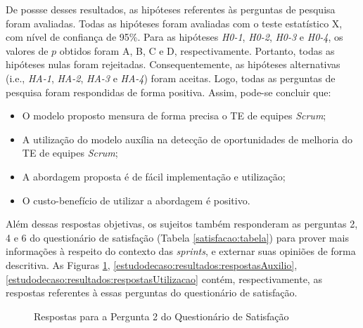 De possse desses resultados, as hipóteses referentes às perguntas de pesquisa foram avaliadas. Todas as hipóteses foram avaliadas com o teste estatístico X, com nível de confiança de 95\%. Para as hipóteses \textit{H0-1}, \textit{H0-2}, \textit{H0-3} e \textit{H0-4}, os valores de $p$ obtidos foram A, B, C e D, respectivamente. Portanto, todas as hipóteses nulas foram rejeitadas. Consequentemente, as hipóteses alternativas (i.e., \textit{HA-1}, \textit{HA-2}, \textit{HA-3} e \textit{HA-4}) foram aceitas. Logo, todas as perguntas de pesquisa foram respondidas de forma positiva. Assim, pode-se concluir que:

\begin{itemize}
  \item O modelo proposto mensura de forma precisa o TE de equipes \textit{Scrum};
  \item A utilização do modelo auxília na detecção de oportunidades de melhoria do TE de equipes \textit{Scrum};
  \item A abordagem proposta é de fácil implementação e utilização;
  \item O custo-benefício de utilizar a abordagem é positivo.
\end{itemize}

Além dessas respostas objetivas, os sujeitos também responderam as perguntas 2, 4 e 6 do questionário de satisfação (Tabela \ref{satisfacao:tabela}) para prover mais informações à respeito do contexto das \textit{sprints}, e externar suas opiniões de forma descritiva. As Figuras \ref{estudodecaso:resultados:respostasFidelidade}, \ref{estudodecaso:resultados:respostasAuxilio}, \ref{estudodecaso:resultados:respostasUtilizacao} contém, respectivamente, as respostas referentes à essas perguntas do questionário de satisfação.

\begin{figure}[ht!]
\begin{center}
	\end{center}
	\caption{Respostas para a Pergunta 2 do Questionário de Satisfação}
	\label{estudodecaso:resultados:respostasFidelidade}
\end{figure}

